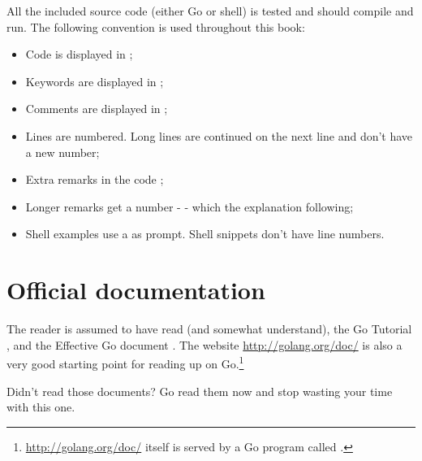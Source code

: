 All the included source code (either Go or shell) is tested
and should compile and run. The following convention is used throughout
this book:
\begin{itemize}
\item Code is displayed in ;
\item Keywords are displayed in ;
\item Comments are displayed in ;
\item Lines are numbered. Long lines are continued on the 
next line and don't have a new number;
\item Extra remarks in the code ;
\item Longer remarks get a number -  - which the explanation following;
\item Shell examples use a \pr{} as prompt. Shell snippets don't have line numbers.
\end{itemize}

\section{Official documentation}
The reader is assumed to have read (and somewhat understand), the
Go Tutorial \cite{go_tutorial}, and the Effective Go
document \cite{effective_go}. The
website \url{http://golang.org/doc/} is also a very good starting point
for reading up on Go.\footnote{\url{http://golang.org/doc/} itself is served by 
a Go program called .}

\begin{lbar}
\noindent Didn't read those documents? Go read them now and stop wasting your time
with this one.
\end{lbar}

